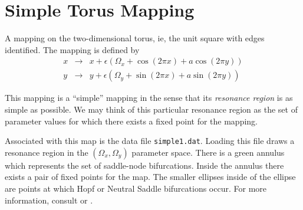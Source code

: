 \section{Simple Torus Mapping}
        A mapping on the two-dimensional torus, ie, the unit square
with edges identified.  The mapping is defined by
\begin{eqnarray*}
	x  &\to& x+\epsilon(\Omega_x+\cos(2 \pi x)+ a \cos(2 \pi y)) \\
	y  &\to& y+\epsilon(\Omega_y+\sin(2 \pi x)+a \sin(2 \pi y))
\end{eqnarray*}

This mapping is a ``simple'' mapping in the sense that its {\em
resonance region} is as simple as possible.  We may think of this
particular resonance region as the
set of parameter values for which there exists a fixed point for the mapping.

Associated with this map is the data file {\tt simple1.dat}.  Loading this
file draws a resonance region in the $(\Omega_x, \Omega_y)$ parameter
space. There is a green annulus which represents the set of
saddle-node bifurcations.  Inside the annulus there exists a pair of
fixed points for the map.  The smaller ellipses inside of the ellipse
are points at which Hopf or Neutral Saddle bifurcations occur.  For
more information, consult \cite{BGKM} or \cite{BGKM:IMA}.